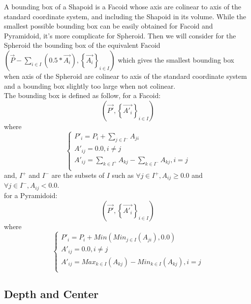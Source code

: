 A bounding box of a Shapoid is a Facoid whose axis are colinear to axis of the standard coordinate system, and including the Shapoid in its volume. While the smallest possible bounding box can be easily obtained for Facoid and Pyramidoid, it's more complicate for Spheroid. Then we will consider for the Spheroid the bounding box of the equivalent Facoid $\left(\overrightarrow{P}-\sum_{i\in I}\left(0.5*\overrightarrow{A_i}\right),\left\lbrace\overrightarrow{A_i}\right\rbrace_{i\in I}\right)$ which gives the smallest bounding box when axis of the Spheroid are colinear to axis of the standard coordinate system and a bounding box slightly too large when not colinear.\\
The bounding box is defined as follow, for a Facoid:\\
\begin{equation}
\left(\overrightarrow{P'},\left\lbrace\overrightarrow{A'_i}\right\rbrace_{i\in I}\right)
\end{equation}
where\\
\begin{equation}
\left\lbrace
\begin{array}{l}
P'_i=P_i+\sum_{j\in I^-}A_{ji}\\
A'_{ij}=0.0,i\neq j\\
A'_{ij}=\sum_{k\in I^+}A_{kj}-\sum_{k\in I^-}A_{kj},i=j\\
\end{array}
\right.
\end{equation}
and, $I^+$ and $I^-$ are the subsets of $I$ such as $\forall j\in I^+,A_{ij}\ge 0.0$ and $\forall j\in I^-,A_{ij}<0.0$.\\

for a Pyramidoid:\\
\begin{equation}
\left(\overrightarrow{P'},\left\lbrace\overrightarrow{A'_i}\right\rbrace_{i\in I}\right)
\end{equation}
where\\
\begin{equation}
\left\lbrace
\begin{array}{l}
P'_i=P_i+Min\left(Min_{j\in I}(A_{ji}),0.0\right)\\
A'_{ij}=0.0,i\neq j\\
A'_{ij}=Max_{k\in I}(A_{kj})-Min_{k\in I}(A_{kj}),i=j\\
\end{array}
\right.
\end{equation}

\subsection{Depth and Center}

